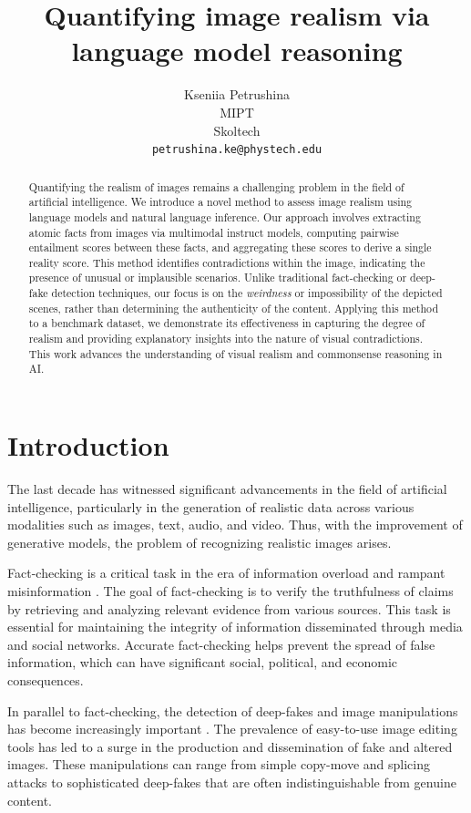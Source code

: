 \documentclass[11pt]{article}
\title{Quantifying image realism via language model
reasoning}
\author{Kseniia Petrushina \\
  MIPT \\
  Skoltech \\
  \texttt{petrushina.ke@phystech.edu} \\}
\begin{document}
\maketitle
\begin{abstract}

Quantifying the realism of images remains a challenging problem in the field of artificial intelligence. We introduce a novel method to assess image realism using language models and natural language inference. Our approach involves extracting atomic facts from images via multimodal instruct models, computing pairwise entailment scores between these facts, and aggregating these scores to derive a single reality score. This method identifies contradictions within the image, indicating the presence of unusual or implausible scenarios. Unlike traditional fact-checking or deep-fake detection techniques, our focus is on the \textit{weirdness} or impossibility of the depicted scenes, rather than determining the authenticity of the content. Applying this method to a benchmark dataset, we demonstrate its effectiveness in capturing the degree of realism and providing explanatory insights into the nature of visual contradictions. This work advances the understanding of visual realism and commonsense reasoning in AI.

\end{abstract}

\section{Introduction}

The last decade has witnessed significant advancements in the field of artificial intelligence, particularly in the generation of realistic data across various modalities such as images, text, audio, and video. Thus, with the improvement of generative models, the problem of recognizing realistic images arises.

Fact-checking is a critical task in the era of information overload and rampant misinformation \cite{fact_checking}. The goal of fact-checking is to verify the truthfulness of claims by retrieving and analyzing relevant evidence from various sources. This task is essential for maintaining the integrity of information disseminated through media and social networks. Accurate fact-checking helps prevent the spread of false information, which can have significant social, political, and economic consequences.

In parallel to fact-checking, the detection of deep-fakes and image manipulations has become increasingly important \cite{image_forgery}. The prevalence of easy-to-use image editing tools has led to a surge in the production and dissemination of fake and altered images. These manipulations can range from simple copy-move and splicing attacks to sophisticated deep-fakes that are often indistinguishable from genuine content.
\end{document}
